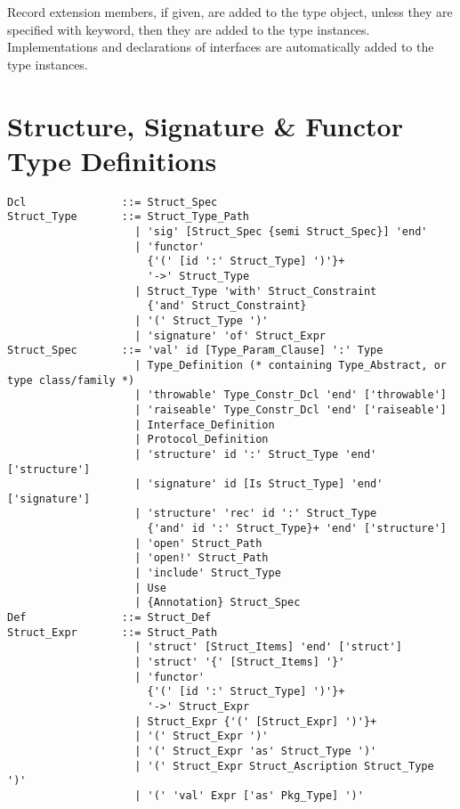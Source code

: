 Record extension members, if given, are added to the type object, unless they are specified with  keyword, then they are added to the type instances. Implementations and declarations of interfaces are automatically added to the type instances. 





\section{Structure, Signature \& Functor Type Definitions}
\label{sec:struct-types}

\syntax\begin{lstlisting}
Dcl               ::= Struct_Spec
Struct_Type       ::= Struct_Type_Path
                    | 'sig' [Struct_Spec {semi Struct_Spec}] 'end'
                    | 'functor' 
                      {'(' [id ':' Struct_Type] ')'}+
                      '->' Struct_Type
                    | Struct_Type 'with' Struct_Constraint 
                      {'and' Struct_Constraint}
                    | '(' Struct_Type ')'
                    | 'signature' 'of' Struct_Expr
Struct_Spec       ::= 'val' id [Type_Param_Clause] ':' Type
                    | Type_Definition (* containing Type_Abstract, or type class/family *)
                    | 'throwable' Type_Constr_Dcl 'end' ['throwable']
                    | 'raiseable' Type_Constr_Dcl 'end' ['raiseable']
                    | Interface_Definition
                    | Protocol_Definition
                    | 'structure' id ':' Struct_Type 'end' ['structure']
                    | 'signature' id [Is Struct_Type] 'end' ['signature']
                    | 'structure' 'rec' id ':' Struct_Type
                      {'and' id ':' Struct_Type}+ 'end' ['structure']
                    | 'open' Struct_Path
                    | 'open!' Struct_Path
                    | 'include' Struct_Type
                    | Use
                    | {Annotation} Struct_Spec
Def               ::= Struct_Def
Struct_Expr       ::= Struct_Path
                    | 'struct' [Struct_Items] 'end' ['struct']
                    | 'struct' '{' [Struct_Items] '}'
                    | 'functor' 
                      {'(' [id ':' Struct_Type] ')'}+
                      '->' Struct_Expr
                    | Struct_Expr {'(' [Struct_Expr] ')'}+
                    | '(' Struct_Expr ')'
                    | '(' Struct_Expr 'as' Struct_Type ')'
                    | '(' Struct_Expr Struct_Ascription Struct_Type ')'
                    | '(' 'val' Expr ['as' Pkg_Type] ')'

\end{lstlisting}
